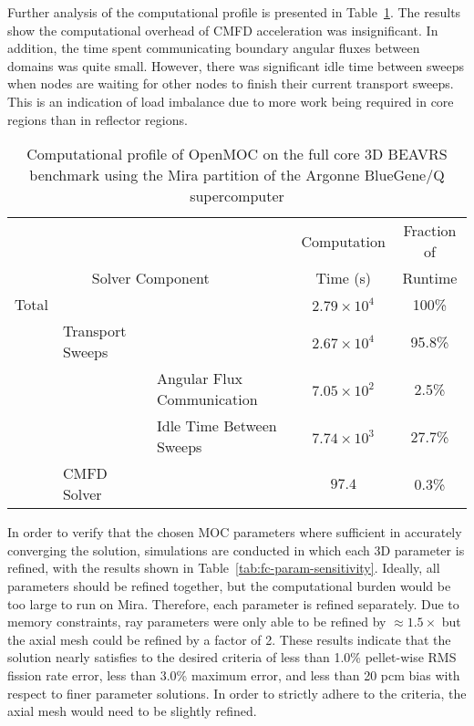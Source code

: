 \documentclass[12pt,twoside]{mitthesis-exec}
\begin{document}
Further analysis of the computational profile is presented in Table~\ref{tab:full-core-comp-prof}. The results show the computational overhead of CMFD acceleration was insignificant. In addition, the time spent communicating boundary angular fluxes between domains was quite small. However, there was significant idle time between sweeps when nodes are waiting for other nodes to finish their current transport sweeps. This is an indication of load imbalance due to more work being required in core regions than in reflector regions.

\begin{table}[ht]
	\centering
	\caption{Computational profile of OpenMOC on the full core 3D BEAVRS benchmark using the Mira partition of the Argonne BlueGene/Q supercomputer}
	\medskip
	\begin{tabular}{lll|c|c}
		\hline
		& & & Computation & Fraction of \\
		\multicolumn{3}{c|}{Solver Component} & Time (s) & Runtime\\
		\hline
		Total & & & $2.79 \times 10^4$ & 100\% \\
		& Transport Sweeps & & $2.67 \times 10^4$ & 95.8\% \\
		& & Angular Flux Communication & $7.05 \times 10^2$ & 2.5\% \\
		& & Idle Time Between Sweeps & $7.74 \times 10^3$ & 27.7\% \\
		& CMFD Solver & & $97.4$ & 0.3\% \\		
		\hline
	\end{tabular}
	\label{tab:full-core-comp-prof}
\end{table}

\newpage

            
In order to verify that the chosen MOC parameters where sufficient in accurately converging the solution, simulations are conducted in which each 3D parameter is refined, with the results shown in Table~\ref{tab:fc-param-sensitivity}. Ideally, all parameters should be refined together, but the computational burden would be too large to run on Mira. Therefore, each parameter is refined separately. Due to memory constraints, ray parameters were only able to be refined by $\approx 1.5 \times$ but the axial mesh could be refined by a factor of 2. These results indicate that the solution nearly satisfies to the desired criteria of less than 1.0\% pellet-wise RMS fission rate error, less than 3.0\% maximum error, and less than 20 pcm bias with respect to finer parameter solutions. In order to strictly adhere to the criteria, the axial mesh would need to be slightly refined.
\end{document}

